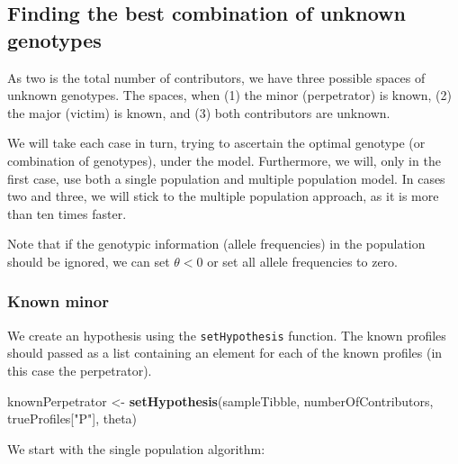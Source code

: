 \documentclass[]{article}
\newenvironment{Shaded}{\begin{snugshade}}{\end{snugshade}}
\newcommand{\KeywordTok}[1]{\textcolor[rgb]{0.13,0.29,0.53}{\textbf{#1}}}
\newcommand{\StringTok}[1]{\textcolor[rgb]{0.31,0.60,0.02}{#1}}
\newcommand{\NormalTok}[1]{#1}
\begin{document}
\subsection{Finding the best combination of unknown
genotypes}\label{sec:maximalUnknown}

As two is the total number of contributors, we have three possible
spaces of unknown genotypes. The spaces, when (1) the minor
(perpetrator) is known, (2) the major (victim) is known, and (3) both
contributors are unknown.

We will take each case in turn, trying to ascertain the optimal genotype
(or combination of genotypes), under the model. Furthermore, we will,
only in the first case, use both a single population and multiple
population model. In cases two and three, we will stick to the multiple
population approach, as it is more than ten times faster.

Note that if the genotypic information (allele frequencies) in the
population should be ignored, we can set \(\theta < 0\) or set all
allele frequencies to zero.

\subsubsection{Known minor}\label{known-minor}

We create an hypothesis using the \texttt{setHypothesis} function. The
known profiles should passed as a list containing an element for each of
the known profiles (in this case the perpetrator).

\begin{Shaded}
\begin{Highlighting}[]
\NormalTok{knownPerpetrator <-}\StringTok{ }\KeywordTok{setHypothesis}\NormalTok{(sampleTibble, numberOfContributors, trueProfiles[}\StringTok{"P"}\NormalTok{], theta)}
\end{Highlighting}
\end{Shaded}

We start with the single population algorithm:
\end{document}
